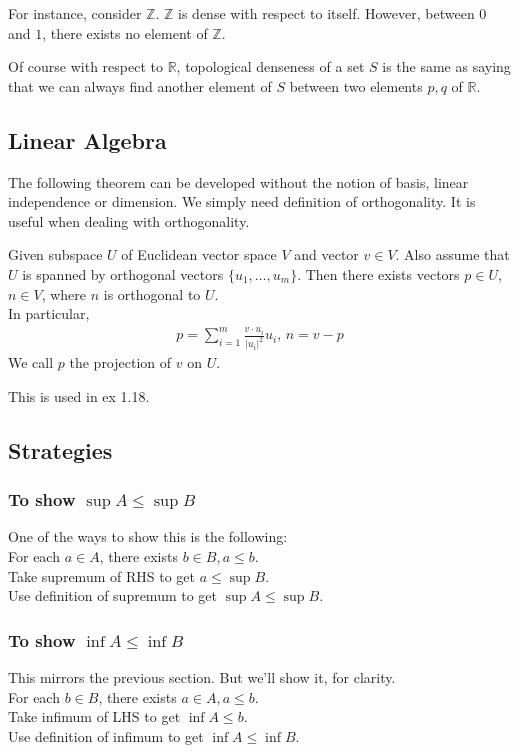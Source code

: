 \documentclass{article}
\begin{document}
For instance, consider $\mathbb{Z}$. $\mathbb{Z}$ is dense with respect to itself. However, between $0$ and $1$, there exists no element of $\mathbb{Z}$.

Of course with respect to $\mathbb{R}$, topological denseness of a set $S$ is the same as saying that we can always find another element of $S$ between two elements $p,q$ of $\mathbb{R}$.


\subsection{Linear Algebra}
The following theorem can be developed without the notion of basis, linear independence or dimension. 
We simply need definition of orthogonality.
It is useful when dealing with orthogonality.

Given subspace $U$ of Euclidean vector space $V$ and vector $v\in V$.
Also assume that $U$ is spanned by orthogonal vectors $\{u_1,\dots, u_m\}$.
Then there exists vectors $p\in U$, $n\in V$, where $n$ is orthogonal to $U$.\\
In particular, 
\begin{align*}
	p = \sum_{i=1}^m\frac{v\cdot u_i}{|u_i|^2}u_i,\, n=v-p
\end{align*}
We call $p$ the projection of $v$ on $U$.

This is used in ex 1.18.


\subsection{Strategies}
\subsubsection{To show $\sup A\leq \sup B$}
One of the ways to show this is the following:\\
For each $a\in A$, there exists $b\in B, a \leq b$.\\
Take supremum of RHS to get $a\leq \sup B$.\\
Use definition of supremum to get $\sup A \leq \sup B$.

\subsubsection{To show $\inf A\leq \inf B$}
This mirrors the previous section. But we'll show it, for clarity.\\
For each $b\in B$, there exists $a\in A, a\leq b$.\\
Take infimum of LHS to get $\inf A\leq b$.\\
Use definition of infimum to get $\inf A\leq \inf B$.
\end{document}
